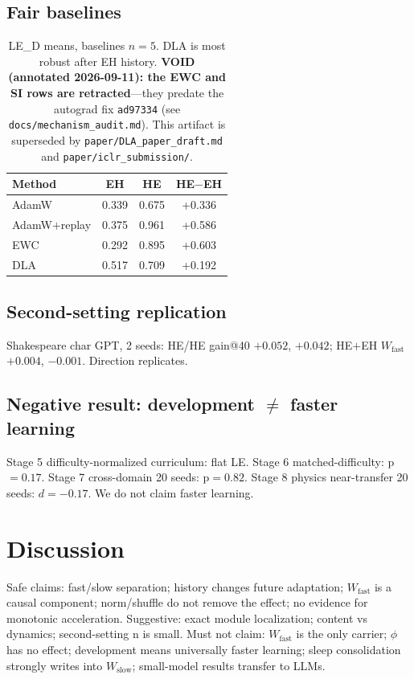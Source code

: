 \documentclass[11pt]{article}
\newcommand{\Wfast}{W_{\mathrm{fast}}}
\newcommand{\Wslow}{W_{\mathrm{slow}}}
\begin{document}
\subsection{Fair baselines}
\begin{table}[h]\centering\small
\begin{tabular}{lccc}
\toprule
Method & EH & HE & HE$-$EH \\
\midrule
AdamW & 0.339 & 0.675 & +0.336 \\
AdamW$+$replay & 0.375 & 0.961 & +0.586 \\
EWC & 0.292 & 0.895 & +0.603 \\
DLA & 0.517 & 0.709 & +0.192 \\
\bottomrule
\end{tabular}
\caption{LE\_D means, baselines $n{=}5$. DLA is most robust after EH history.
\textbf{VOID (annotated 2026-09-11): the EWC and SI rows are retracted}---they predate the
autograd fix \texttt{ad97334} (see \texttt{docs/mechanism\_audit.md}). This artifact is
superseded by \texttt{paper/DLA\_paper\_draft.md} and \texttt{paper/iclr\_submission/}.}
\end{table}

\subsection{Second-setting replication}
Shakespeare char GPT, 2 seeds: HE/HE gain@40 $+0.052$, $+0.042$; HE$+$EH $\Wfast$ $+0.004$, $-0.001$. Direction replicates.

\subsection{Negative result: development $\neq$ faster learning}
Stage 5 difficulty-normalized curriculum: flat LE. Stage 6 matched-difficulty: p$=0.17$. Stage 7 cross-domain 20 seeds: p$=0.82$. Stage 8 physics near-transfer 20 seeds: $d=-0.17$. We do not claim faster learning.

\section{Discussion}
Safe claims: fast/slow separation; history changes future adaptation; $\Wfast$ is a causal component; norm/shuffle do not remove the effect; no evidence for monotonic acceleration.
Suggestive: exact module localization; content vs dynamics; second-setting n is small.
Must not claim: $\Wfast$ is the only carrier; $\phi$ has no effect; development means universally faster learning; sleep consolidation strongly writes into $\Wslow$; small-model results transfer to LLMs.
\end{document}
